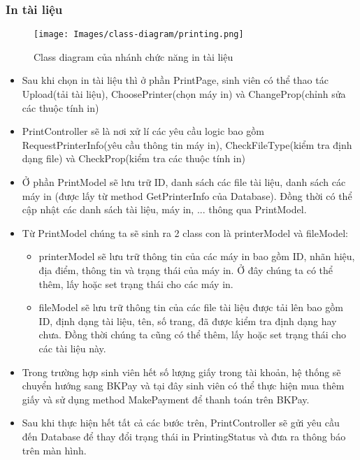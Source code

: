 \subsubsection{In tài liệu}
\begin{figure}[H]
    \centering
    \texttt{[image: Images/class-diagram/printing.png]}
    \vspace{0.1cm}
    \caption{Class diagram của nhánh chức năng in tài liệu}
\end{figure}
\begin{itemize}
    \item Sau khi chọn in tài liệu thì ở phần PrintPage, sinh viên có thể thao tác Upload(tải tài liệu), ChoosePrinter(chọn máy in) và ChangeProp(chỉnh sửa các thuộc tính in)
    \item PrintController sẽ là nơi xử lí các yêu cầu logic bao gồm RequestPrinterInfo(yêu cầu thông tin máy in), CheckFileType(kiểm tra định dạng file) và CheckProp(kiểm tra các thuộc tính in)
    \item Ở phần PrintModel sẽ lưu trữ ID, danh sách các file tài liệu, danh sách các máy in (được lấy từ method GetPrinterInfo của Database). Đồng thời có thể cập nhật các danh sách tài liệu, máy in, ... thông qua PrintModel.
    \item Từ PrintModel chúng ta sẽ sinh ra 2 class con là printerModel và fileModel:
    \begin{itemize}
        \item printerModel sẽ lưu trữ thông tin của các máy in bao gồm ID, nhãn hiệu, địa điểm, thông tin và trạng thái của máy in. Ở đây chúng ta có thể thêm, lấy hoặc set trạng thái cho các máy in.
        \item fileModel sẽ lưu trữ thông tin của các file tài liệu được tải lên bao gồm ID, định dạng tài liệu, tên, số trang, đã được kiểm tra định dạng hay chưa. Đồng thời chúng ta cũng có thể thêm, lấy hoặc set trạng thái cho các tài liệu này.
    \end{itemize}
    \item Trong trường hợp sinh viên hết số lượng giấy trong tài khoản, hệ thống sẽ chuyển hướng sang BKPay và tại đây sinh viên có thể thực hiện mua thêm giấy và sử dụng method MakePayment để thanh toán trên BKPay.
    \item Sau khi thực hiện hết tất cả các bước trên, PrintController sẽ gửi yêu cầu đến Database để thay đổi trạng thái in PrintingStatus và đưa ra thông báo trên màn hình.
\end{itemize}

